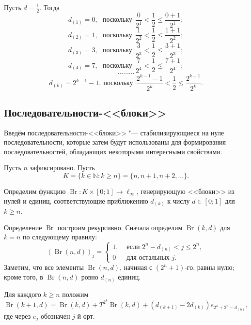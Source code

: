 \begin{example}
	Пусть $d=\frac12$.
	Тогда
	$$
		d_{(1)} = 0, ~~~\mbox{поскольку}~~ \frac{0}{2^1} < \frac12 \leq \frac{0+1}{2^1};
	$$
	$$
		d_{(2)} = 1, ~~~\mbox{поскольку}~~ \frac{1}{2^2} < \frac12 \leq \frac{1+1}{2^2};
	$$
	$$
		d_{(3)} = 3, ~~~\mbox{поскольку}~~ \frac{3}{2^3} < \frac12 \leq \frac{3+1}{2^3};
	$$
	$$
		d_{(4)} = 7, ~~~\mbox{поскольку}~~ \frac{7}{2^4} < \frac12 \leq \frac{7+1}{2^4};
	$$
	$$
		\dots\dots\dots
	$$
	$$
		d_{(k)} = 2^{k-1}-1, ~\mbox{поскольку}~~ \frac{2^{k-1}-1}{2^k} < \frac12 \leq \frac{2^{k-1}}{2^k}.
	$$
\end{example}

\subsection{Последовательности-<<блоки>>}

Введём последовательности-<<блоки>> "---
стабилизирующиеся на нуле последовательности,
которые затем будут использованы для формирования последовательностей,
обладающих некоторыми интересными свойствами.

Пусть $n$ зафиксировано.
Пусть
\begin{equation}
	K = \{k\in\mathbb{N} : k \geq n\} = \{n, n+1, n+2, ...\}
	.
\end{equation}


Определим функцию $\operatorname{Br}:K\times [0;1] \to \ell_\infty$,
генерирующую <<блоки>> из нулей и единиц,
соответствующие приближению $d_{(k)}$ к числу $d\in[0;1]$ для $k \geq n$.

Определение $\operatorname{Br}$ построим рекурсивно.
Сначала определим $\operatorname{Br}(k,d)$ для $k=n$ по следующему правилу:
\begin{equation}
	(\operatorname{Br}(n,d))_j = \begin{cases}
		1, & \mbox{~если~} 2^n - d_{(n)} < j \leq 2^n,
		\\
		0  & \mbox{~для остальных~} j
		.
	\end{cases}
\end{equation}
Заметим, что все элементы $\operatorname{Br}(n,d)$, начиная с $(2^n+1)$-го, равны нулю;
кроме того, в $\operatorname{Br}(n,d)$ ровно $d_{(n)}$ единиц.

Для каждого $k \geq n$ положим
\begin{equation}
	\label{eq:Br(k+1,d)}
	\operatorname{Br}(k+1,d) = \operatorname{Br}(k,d) + T^{2^k}\operatorname{Br}(k,d) + (d_{(k+1)}-2d_{(k)})e_{2^k+2^n-d_{(n)}}
	,
\end{equation}
где через $e_j$ обозначен $j$-й орт.


